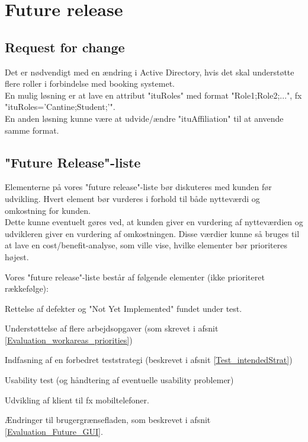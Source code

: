 \section{Future release}
\label{Evaluation_Future}
\subsection{Request for change}
\label{Evaluation_Future_RFC}
Det er nødvendigt med en ændring i Active Directory, hvis det skal understøtte flere roller i forbindelse med booking systemet. 
\\En mulig løsning er at lave en attribut "ituRoles" med format "Role1;Role2;...", fx "ituRoles='Cantine;Student;'". 
\\En anden løsning kunne være at udvide/ændre "ituAffiliation" til at anvende samme format.

\subsection{"Future Release"-liste}
\label{Evaluation_Future_FR}
Elementerne på vores "future release"-liste bør diskuteres med kunden før udvikling. Hvert element bør vurderes i forhold til både nytteværdi og omkostning for kunden. 
\\Dette kunne eventuelt gøres ved, at kunden giver en vurdering af nytteværdien og udvikleren giver en vurdering af omkostningen. Disse værdier kunne så bruges til at lave en cost/benefit-analyse, som ville vise, hvilke elementer bør prioriteres højest.

Vores "future release"-liste består af følgende elementer (ikke prioriteret rækkefølge):
\begin{my_description}
\item[Fejlrettelse] Rettelse af defekter og "Not Yet Implemented" fundet under test.
\item[Nye arbejdsopgaver] Understøttelse af flere arbejdsopgaver (som skrevet i afsnit \ref{Evaluation_workareas_priorities})
\item[Forbedret teststrategi] Indfasning af en forbedret teststrategi (beskrevet i afsnit \ref{Test_intendedStrat})
\item[Usability Test] Usability test (og håndtering af eventuelle usability problemer)
\item[Nye platforme] Udvikling af klient til fx mobiltelefoner.
\item[Brugergrænseflade] Ændringer til brugergrænsefladen, som beskrevet i afsnit \ref{Evaluation_Future_GUI}.
\end{my_description}

